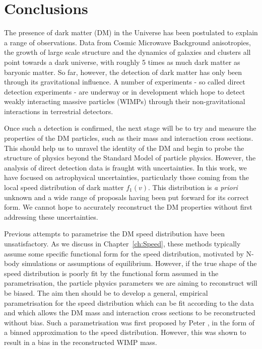 \chapter{Conclusions}
\label{ch:Conclusions}

The presence of dark matter (DM) in the Universe has been postulated to explain a range of observations. Data from Cosmic Microwave Background anisotropies, the growth of large scale structure and the dynamics of galaxies and clusters all point towards a dark universe, with roughly 5 times as much dark matter as baryonic matter. So far, however, the detection of dark matter has only been through its gravitational influence. A number of experiments - so called direct detection experiments - are underway or in development which hope to detect weakly interacting massive particles (WIMPs) through their non-gravitational interactions in terrestrial detectors.

Once such a detection is confirmed, the next stage will be to try and measure the properties of the DM particles, such as their mass and interaction cross sections. This should help us to unravel the identity of the DM and begin to probe the structure of physics beyond the Standard Model of particle physics. However, the analysis of direct detection data is fraught with uncertainties. In this work, we have focused on astrophysical uncertainties, particularly those coming from the local speed distribution of dark matter $f_1(v)$. This distribution is \textit{a priori} unknown and a wide range of proposals having been put forward for its correct form. We cannot hope to accurately reconstruct the DM properties without first addressing these uncertainties.

Previous attempts to parametrise the DM speed distribution have been unsatisfactory. As we discuss in Chapter~\ref{ch:Speed}, these methods typically assume some specific functional form for the speed distribution, motivated by N-body simulations or assumptions of equilibrium. However, if the true shape of the speed distribution is poorly fit by the functional form assumed in the parametrisation, the particle physics parameters we are aiming to reconstruct will be biased. The aim then should be to develop a general, empirical parametrisation for the speed distribution which can be fit according to the data and which allows the DM mass and interaction cross sections to be reconstructed without bias. Such a parametrisation was first proposed by Peter \cite{Peter:2011}, in the form of a binned approximation to the speed distribution. However, this was shown to result in a bias in the reconstructed WIMP mass.

